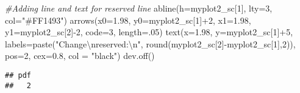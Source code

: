 \documentclass[
]{article}
\newenvironment{Shaded}{\begin{snugshade}}{\end{snugshade}}
\newcommand{\AttributeTok}[1]{\textcolor[rgb]{0.77,0.63,0.00}{#1}}
\newcommand{\CommentTok}[1]{\textcolor[rgb]{0.56,0.35,0.01}{\textit{#1}}}
\newcommand{\DecValTok}[1]{\textcolor[rgb]{0.00,0.00,0.81}{#1}}
\newcommand{\FloatTok}[1]{\textcolor[rgb]{0.00,0.00,0.81}{#1}}
\newcommand{\FunctionTok}[1]{\textcolor[rgb]{0.00,0.00,0.00}{#1}}
\newcommand{\NormalTok}[1]{#1}
\newcommand{\SpecialCharTok}[1]{\textcolor[rgb]{0.00,0.00,0.00}{#1}}
\newcommand{\StringTok}[1]{\textcolor[rgb]{0.31,0.60,0.02}{#1}}
\begin{document}
\begin{Shaded}
\begin{Highlighting}[]
\CommentTok{\#Adding line and text for reserved line}
\FunctionTok{abline}\NormalTok{(}\AttributeTok{h=}\NormalTok{myplot2\_sc[}\DecValTok{1}\NormalTok{], }\AttributeTok{lty=}\DecValTok{3}\NormalTok{, }\AttributeTok{col=}\StringTok{"\#FF1493"}\NormalTok{)}
\FunctionTok{arrows}\NormalTok{(}\AttributeTok{x0=}\FloatTok{1.98}\NormalTok{, }\AttributeTok{y0=}\NormalTok{myplot2\_sc[}\DecValTok{1}\NormalTok{]}\SpecialCharTok{+}\DecValTok{2}\NormalTok{, }\AttributeTok{x1=}\FloatTok{1.98}\NormalTok{, }\AttributeTok{y1=}\NormalTok{myplot2\_sc[}\DecValTok{2}\NormalTok{]}\SpecialCharTok{{-}}\DecValTok{2}\NormalTok{, }\AttributeTok{code=}\DecValTok{3}\NormalTok{, }\AttributeTok{length=}\NormalTok{.}\DecValTok{05}\NormalTok{)}
\FunctionTok{text}\NormalTok{(}\AttributeTok{x=}\FloatTok{1.98}\NormalTok{, }\AttributeTok{y=}\NormalTok{myplot2\_sc[}\DecValTok{1}\NormalTok{]}\SpecialCharTok{+}\DecValTok{5}\NormalTok{,  }\AttributeTok{labels=}\FunctionTok{paste}\NormalTok{(}\StringTok{"Change}\SpecialCharTok{\textbackslash{}n}\StringTok{reserved:}\SpecialCharTok{\textbackslash{}n}\StringTok{"}\NormalTok{, }\FunctionTok{round}\NormalTok{(myplot2\_sc[}\DecValTok{2}\NormalTok{]}\SpecialCharTok{{-}}\NormalTok{myplot2\_sc[}\DecValTok{1}\NormalTok{],}\DecValTok{2}\NormalTok{)), }\AttributeTok{pos=}\DecValTok{2}\NormalTok{, }\AttributeTok{cex=}\FloatTok{0.8}\NormalTok{, }\AttributeTok{col =} \StringTok{"black"}\NormalTok{)}
\FunctionTok{dev.off}\NormalTok{()}
\end{Highlighting}
\end{Shaded}

\begin{verbatim}
## pdf 
##   2
\end{verbatim}
\end{document}
